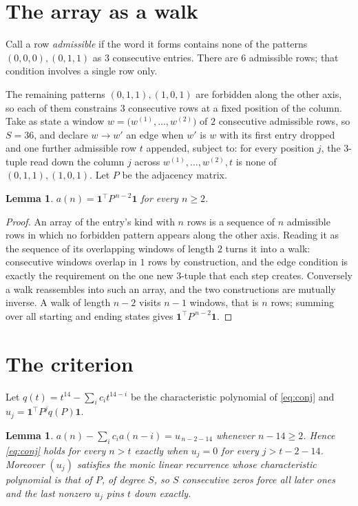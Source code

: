 \documentclass[11pt,a4paper]{article}
\theoremstyle{plain}
\newtheorem{lemma}[theorem]{Lemma}
\theoremstyle{definition}
\begin{document}
\section{The array as a walk}

Call a row \emph{admissible} if the word it forms contains none of the patterns
$(0,0,0), (0,1,1)$ as $3$ consecutive entries. There are $6$ admissible rows; that condition
involves a single row only.

The remaining patterns $(0,1,1), (1,0,1)$ are forbidden along the other axis, so each of them
constrains $3$ consecutive rows at a fixed position of the column. Take as state a
window $w=\bigl(w^{(1)},\dots,w^{(2)}\bigr)$ of $2$ consecutive admissible
rows, so $S=36$, and declare $w\to w'$ an edge when $w'$ is $w$ with its first entry
dropped and one further admissible row $t$ appended, subject to: for every position
$j$, the $3$-tuple read down the column $j$ across $w^{(1)},\dots,w^{(2)},t$
is none of $(0,1,1), (1,0,1)$. Let $P$ be the adjacency matrix.

\begin{lemma}\label{lem:walk}
$a(n)=\mathbf{1}^{\!\top}P^{\,n-2}\mathbf{1}$ for every $n\ge2$.
\end{lemma}

\begin{proof}
An array of the entry's kind with $n$ rows is a sequence of $n$ admissible rows in
which no forbidden pattern appears along the other axis. Reading it as the sequence of its
overlapping windows of length $2$ turns it into a walk: consecutive windows overlap in
$1$ rows by construction, and the edge condition is exactly the requirement on the one
new $3$-tuple that each step creates. Conversely a walk reassembles into such an array,
and the two constructions are mutually inverse. A walk of length $n-2$ visits $n-1$
windows, that is $n$ rows; summing over all starting and ending states gives
$\mathbf{1}^{\!\top}P^{\,n-2}\mathbf{1}$.
\end{proof}

\section{The criterion}

Let $q(t)=t^{14}-\sum_i c_i t^{14-i}$ be the characteristic polynomial of
\eqref{eq:conj} and $u_j=\mathbf{1}^{\!\top}P^{j}q(P)\mathbf{1}$.

\begin{lemma}\label{lem:crit}
$a(n)-\sum_i c_i a(n-i)=u_{\,n-2-14}$ whenever $n-14\ge2$. Hence
\eqref{eq:conj} holds for every $n>t$ exactly when $u_j=0$ for every
$j>t-2-14$. Moreover $(u_j)$ satisfies the monic linear recurrence whose
characteristic polynomial is that of $P$, of degree $S$, so $S$ consecutive zeros force all
later ones and the last nonzero $u_j$ pins $t$ down exactly.
\end{lemma}
\end{document}
